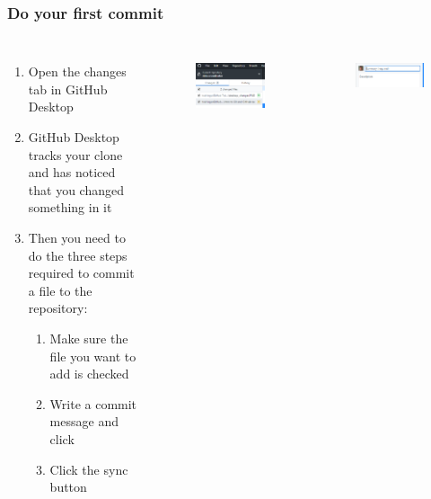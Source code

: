 \documentclass[aspectratio=169]{beamer} %
\begin{document}
\begin{frame}
\frametitle{Do your first commit}

\begin{columns}[c] 


\begin{enumerate}
	\item Open the changes tab in GitHub Desktop
	\item GitHub Desktop tracks your clone and has noticed that you changed something in it
	\item Then you need to do the three steps required to commit a file to the repository:
	\begin{enumerate}
		\item Make sure the file you want to add is checked
		\item Write a commit message and click 
		\item Click the sync button
	\end{enumerate}
\end{enumerate}

\begin{figure}
	\centering
	\includegraphics[width=1\linewidth]{img/desktop_changes}
	\label{fig:desktopchanges}
\end{figure}

\begin{figure}
	\centering
	\includegraphics[width=1\linewidth]{img/desktop_commit}
	\label{fig:desktop_commit}
\end{figure}

\end{columns}

\end{frame}
\end{document}
